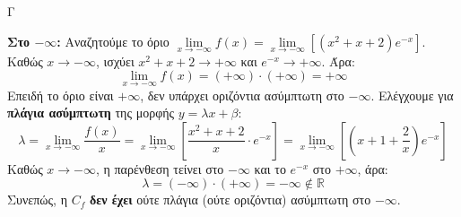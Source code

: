 \begin{thema}{Γ}
\begin{erwthma}
\textbf{Στο $-\infty$:}
Αναζητούμε το όριο $\lim\limits_{x\to-\infty}f(x)=\lim\limits_{x\to-\infty}\left[(x^2+x+2)e^{-x}\right]$. Καθώς $x\to-\infty$, ισχύει $x^2+x+2\to+\infty$ και $e^{-x}\to+\infty$. Άρα:
\[\lim_{x\to-\infty}f(x)=(+\infty)\cdot(+\infty)=+\infty\]
Επειδή το όριο είναι $+\infty$, δεν υπάρχει οριζόντια ασύμπτωτη στο $-\infty$. Ελέγχουμε για \textbf{πλάγια ασύμπτωτη} της μορφής $y=\lambda x+\beta$:
\[\lambda = \lim_{x\to-\infty}\frac{f(x)}{x} = \lim_{x\to-\infty}\left[\frac{x^2+x+2}{x}\cdot e^{-x}\right] = \lim_{x\to-\infty}\left[\left(x+1+\frac{2}{x}\right)e^{-x}\right]\]
Καθώς $x\to-\infty$, η παρένθεση τείνει στο $-\infty$ και το $e^{-x}$ στο $+\infty$, άρα:
\[\lambda = (-\infty)\cdot(+\infty) = -\infty \notin \mathbb{R}\]
Συνεπώς, η $C_f$ \textbf{δεν έχει} ούτε πλάγια (ούτε οριζόντια) ασύμπτωτη στο $-\infty$.
\end{erwthma}
\end{thema}
